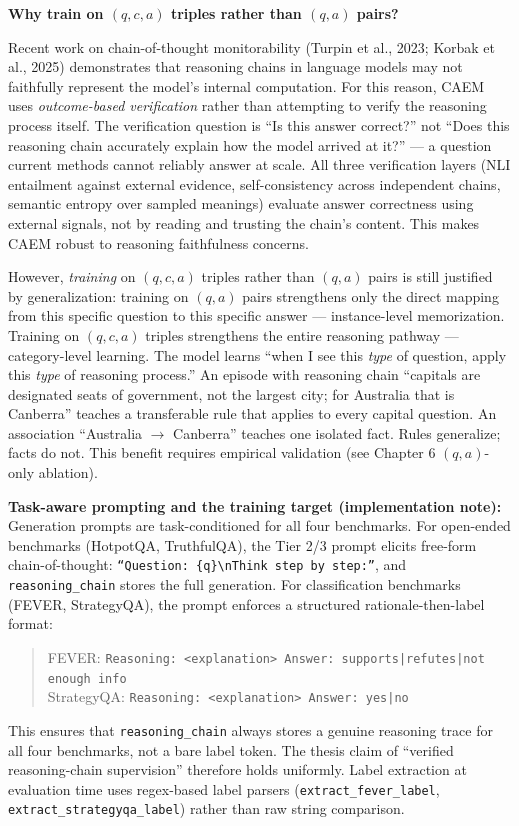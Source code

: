 \documentclass[12pt,a4paper]{article}
\theoremstyle{definition}
\newcommand{\caem}{\textsc{CAEM}}
\begin{document}
\begin{designbox}
\textbf{Why train on $(q, c, a)$ triples rather than $(q, a)$ pairs?}

Recent work on chain-of-thought monitorability (Turpin et al., 2023; Korbak et al., 2025) demonstrates that reasoning chains in language models may not faithfully represent the model's internal computation. For this reason, \caem{} uses \textit{outcome-based verification} rather than attempting to verify the reasoning process itself. The verification question is ``Is this answer correct?'' not ``Does this reasoning chain accurately explain how the model arrived at it?'' --- a question current methods cannot reliably answer at scale. All three verification layers (NLI entailment against external evidence, self-consistency across independent chains, semantic entropy over sampled meanings) evaluate answer correctness using external signals, not by reading and trusting the chain's content. This makes \caem{} robust to reasoning faithfulness concerns.

However, \textit{training} on $(q, c, a)$ triples rather than $(q, a)$ pairs is still justified by generalization: training on $(q, a)$ pairs strengthens only the direct mapping from this specific question to this specific answer --- instance-level memorization. Training on $(q, c, a)$ triples strengthens the entire reasoning pathway --- category-level learning. The model learns ``when I see this \textit{type} of question, apply this \textit{type} of reasoning process.'' An episode with reasoning chain ``capitals are designated seats of government, not the largest city; for Australia that is Canberra'' teaches a transferable rule that applies to every capital question. An association ``Australia $\to$ Canberra'' teaches one isolated fact. Rules generalize; facts do not. This benefit requires empirical validation (see Chapter 6 $(q,a)$-only ablation).

\textbf{Task-aware prompting and the training target (implementation note):}
Generation prompts are task-conditioned for all four benchmarks. For open-ended benchmarks (HotpotQA, TruthfulQA), the Tier 2/3 prompt elicits free-form chain-of-thought: \texttt{``Question: \{q\}\textbackslash{}nThink step by step:''}, and \texttt{reasoning\_chain} stores the full generation. For classification benchmarks (FEVER, StrategyQA), the prompt enforces a structured rationale-then-label format:
\begin{quote}
FEVER: \texttt{Reasoning: <explanation> Answer: supports|refutes|not enough info}\\
StrategyQA: \texttt{Reasoning: <explanation> Answer: yes|no}
\end{quote}
This ensures that \texttt{reasoning\_chain} always stores a genuine reasoning trace for all four benchmarks, not a bare label token. The thesis claim of ``verified reasoning-chain supervision'' therefore holds uniformly. Label extraction at evaluation time uses regex-based label parsers (\texttt{extract\_fever\_label}, \texttt{extract\_strategyqa\_label}) rather than raw string comparison.
\end{designbox}
\end{document}
